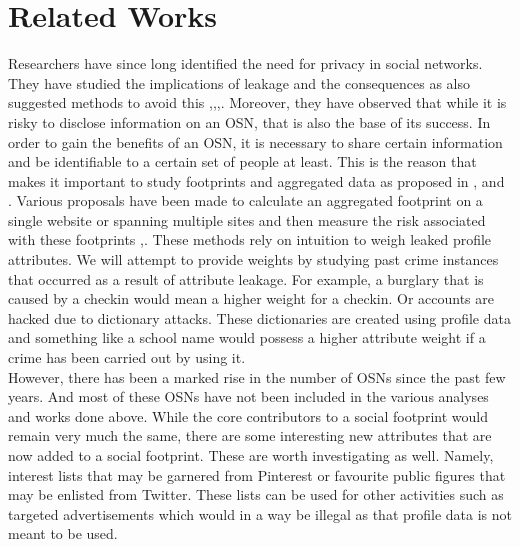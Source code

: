 \documentclass[10pt,conference]{IEEEtran}
\begin{document}
\section{Related Works}
Researchers have since long identified the need for privacy in social networks. They have studied the implications of leakage and the consequences as also suggested methods to avoid this \cite{emergingthreat},\cite{inforevelation},\cite{privacypaper},\cite{undermining}. Moreover, they have observed that while it is risky to disclose information on an OSN, that is also the base of its success. In order to gain the benefits of an OSN, it is necessary to share certain information and be identifiable to a certain set of people at least. This is the reason that makes it important to study footprints and aggregated data as proposed in \cite{emergingthreat},\cite{leakage} and \cite{paas}. Various proposals have been made to calculate an aggregated footprint on a single website or spanning multiple sites and then measure the risk associated with these footprints \cite{socialgraph},\cite{framework}. These methods rely on intuition to weigh leaked profile attributes. We will attempt to provide weights by studying past crime instances that occurred as a result of attribute leakage. For example, a burglary that is caused by a checkin would mean a higher weight for a checkin. Or accounts are hacked due to dictionary attacks. These dictionaries are created using profile data and something like a school name would possess a higher attribute weight if a crime has been carried out by using it. \\

However, there has been a marked rise in the number of OSNs since the past few years. And most of these OSNs have not been included in the various analyses and works done above. While the core contributors to a social footprint would remain very much the same, there are some interesting new attributes that are now added to a social footprint. These are worth investigating as well. Namely, interest lists that may be garnered from Pinterest or favourite public figures that may be enlisted from Twitter. These lists can be used for other activities such as targeted advertisements which would in a way be illegal as that profile data is not meant to be used.\\
\end{document}
